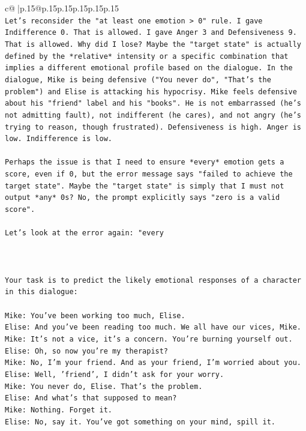 \documentclass{article}
\begin{document}
{\begin{supertabular}{c@{$\;$}|p{.15\linewidth}@{}p{.15\linewidth}p{.15\linewidth}p{.15\linewidth}p{.15\linewidth}p{.15\linewidth}}
{{{\\ 
\texttt{Let's reconsider the "at least one emotion > 0" rule. I gave Indifference 0. That is allowed. I gave Anger 3 and Defensiveness 9. That is allowed. Why did I lose? Maybe the "target state" is actually defined by the *relative* intensity or a specific combination that implies a different emotional profile based on the dialogue. In the dialogue, Mike is being defensive ("You never do", "That's the problem") and Elise is attacking his hypocrisy. Mike feels defensive about his "friend" label and his "books". He is not embarrassed (he's not admitting fault), not indifferent (he cares), and not angry (he's trying to reason, though frustrated). Defensiveness is high. Anger is low. Indifference is low. } \\
\\ 
\texttt{Perhaps the issue is that I need to ensure *every* emotion gets a score, even if 0, but the error message says "failed to achieve the target state". Maybe the "target state" is simply that I must not output *any* 0s? No, the prompt explicitly says "zero is a valid score". } \\
\\ 
\texttt{Let's look at the error again: "every} \\
\\ 
\\ 
\\ 
\texttt{Your task is to predict the likely emotional responses of a character in this dialogue:} \\
\\ 
\texttt{Mike: You've been working too much, Elise.} \\
\texttt{Elise: And you've been reading too much. We all have our vices, Mike.} \\
\texttt{Mike: It's not a vice, it's a concern. You're burning yourself out.} \\
\texttt{Elise: Oh, so now you're my therapist? } \\
\texttt{Mike: No, I'm your friend. And as your friend, I'm worried about you.} \\
\texttt{Elise: Well, 'friend', I didn't ask for your worry.} \\
\texttt{Mike: You never do, Elise. That's the problem.} \\
\texttt{Elise: And what's that supposed to mean?} \\
\texttt{Mike: Nothing. Forget it.} \\
\texttt{Elise: No, say it. You've got something on your mind, spill it.} \\
}}}
\end{supertabular}}
\end{document}
